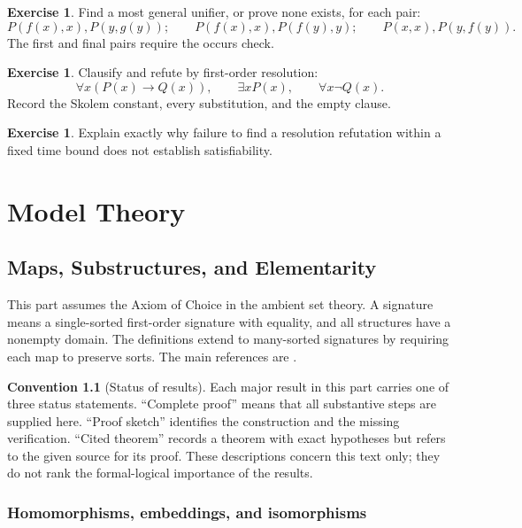 \documentclass[11pt,oneside,openany]{book}
\theoremstyle{definition}
\newtheorem{exercise}[definition]{Exercise}
\newtheorem{convention}[definition]{Convention}
\theoremstyle{plain}
\theoremstyle{remark}
\begin{document}
\begin{exercise}
\label{ex:fol-cardinality-normalforms-08}
Find a most general unifier, or prove none exists, for each pair:
\[
 P(f(x),x),P(y,g(y));
 \qquad
 P(f(x),x),P(f(y),y);
 \qquad
 P(x,x),P(y,f(y)).
\]
The first and final pairs require the occurs check.
\end{exercise}

\begin{exercise}
\label{ex:fol-cardinality-normalforms-09}
Clausify and refute by first-order resolution:
\[
 \forall x(P(x)\to Q(x)),
 \qquad
 \exists xP(x),
 \qquad
 \forall x\neg Q(x).
\]
Record the Skolem constant, every substitution, and the empty clause.
\end{exercise}

\begin{exercise}
\label{ex:fol-cardinality-normalforms-10}
Explain exactly why failure to find a resolution refutation within
a fixed time bound does not establish satisfiability.
\end{exercise}
\part{Model Theory}
\label{part:model-theory}

\chapter{Maps, Substructures, and Elementarity}
\label{ch:maps-elementarity}

This part assumes the Axiom of Choice in the ambient set theory.  A signature means a
single-sorted first-order signature with equality, and all structures have a
nonempty domain.  The definitions extend to many-sorted signatures by requiring
each map to preserve sorts.  The main references are
\cite{ChangKeisler1990,Hodges1993,Marker2002}.

\begin{convention}[Status of results]
Each major result in this part carries one of three status statements.
``Complete proof'' means that all substantive steps are supplied here.
``Proof sketch'' identifies the construction and the missing verification.
``Cited theorem'' records a theorem with exact hypotheses but refers to the
given source for its proof.  These descriptions concern this text only; they do
not rank the formal-logical importance of the results.
\end{convention}

\section{Homomorphisms, embeddings, and isomorphisms}
\label{sec:maps-elementarity-01}
\end{document}
